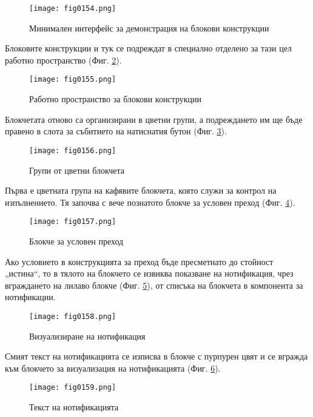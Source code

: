 \begin{figure}[H]
  \centering
  \texttt{[image: fig0154.png]}
  \caption{Минимален интерфейс за демонстрация на блокови конструкции}
\label{fig0154}
\end{figure}

Блоковите конструкции и тук се подреждат в специално отделено за тази цел работно пространство (Фиг. \ref{fig0155}).

\begin{figure}[H]
  \centering
  \texttt{[image: fig0155.png]}
  \caption{Работно пространство за блокови конструкции}
\label{fig0155}
\end{figure}

Блокчетата отново са организирани в цветни групи, а подреждането им ще бъде правено в слота за събитието на натиснатия бутон (Фиг. \ref{fig0156}).

\begin{figure}[H]
  \centering
  \texttt{[image: fig0156.png]}
  \caption{Групи от цветни блокчета}
\label{fig0156}
\end{figure}

Първа е цветната група на кафявите блокчета, която служи за контрол на изпълнението. Тя започва с вече познатото блокче за условен преход (Фиг. \ref{fig0157}).

\begin{figure}[H]
  \centering
  \texttt{[image: fig0157.png]}
  \caption{Блокче за условен преход}
\label{fig0157}
\end{figure}

Ако условието в конструкцията за преход бъде пресметнато до стойност „истина“, то в тялото на блокчето се извиква показване на нотификация, чрез вграждането на лилаво блокче (Фиг. \ref{fig0158}), от списъка на блокчета в компонента за нотификации.

\begin{figure}[H]
  \centering
  \texttt{[image: fig0158.png]}
  \caption{Визуализиране на нотификация}
\label{fig0158}
\end{figure}

Смият текст на нотификацията се изписва в блокче с пурпурен цвят и се вгражда към блокчето за визуализация на нотификацията (Фиг. \ref{fig0159}).

\begin{figure}[H]
  \centering
  \texttt{[image: fig0159.png]}
  \caption{Текст на нотификацията}
\label{fig0159}
\end{figure}


